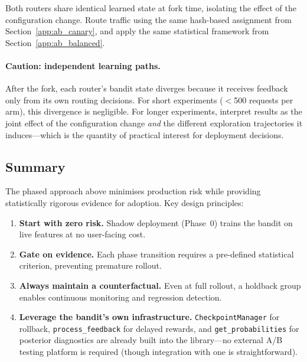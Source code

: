 Both routers share identical learned state at fork time, isolating the effect of the configuration change.
Route traffic using the same hash-based assignment from Section~\ref{app:ab_canary}, and apply the same statistical framework from Section~\ref{app:ab_balanced}.

\paragraph{Caution: independent learning paths.}
After the fork, each router's bandit state diverges because it receives feedback only from its own routing decisions.
For short experiments ($<$500 requests per arm), this divergence is negligible.
For longer experiments, interpret results as the joint effect of the configuration change \emph{and} the different exploration trajectories it induces---which is the quantity of practical interest for deployment decisions.


\subsection{Summary}
\label{app:ab_summary}

The phased approach above minimises production risk while providing statistically rigorous evidence for adoption.
Key design principles:
\begin{enumerate}[nosep,leftmargin=*]
    \item \textbf{Start with zero risk.}  Shadow deployment (Phase~0) trains the bandit on live features at no user-facing cost.
    \item \textbf{Gate on evidence.}  Each phase transition requires a pre-defined statistical criterion, preventing premature rollout.
    \item \textbf{Always maintain a counterfactual.}  Even at full rollout, a holdback group enables continuous monitoring and regression detection.
    \item \textbf{Leverage the bandit's own infrastructure.}  \texttt{CheckpointManager} for rollback, \texttt{process\_feedback} for delayed rewards, and \texttt{get\_probabilities} for posterior diagnostics are already built into the library---no external A/B testing platform is required (though integration with one is straightforward).
\end{enumerate}

